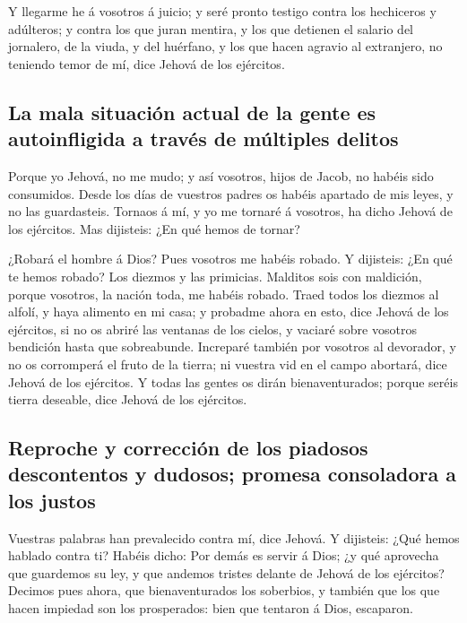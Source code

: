  Y llegarme he á vosotros á juicio; y seré pronto testigo
contra los hechiceros y adúlteros; y contra los que juran mentira, y los
que detienen el salario del jornalero, de la viuda, y del huérfano, y
los que hacen agravio al extranjero, no teniendo temor de mí, dice
Jehová de los ejércitos.

\hypertarget{la-mala-situaciuxf3n-actual-de-la-gente-es-autoinfligida-a-travuxe9s-de-muxfaltiples-delitos}{%
\subsection{La mala situación actual de la gente es autoinfligida a
través de múltiples
delitos}\label{la-mala-situaciuxf3n-actual-de-la-gente-es-autoinfligida-a-travuxe9s-de-muxfaltiples-delitos}}

 Porque yo Jehová, no me mudo; y así vosotros, hijos de
Jacob, no habéis sido consumidos.  Desde los días de
vuestros padres os habéis apartado de mis leyes, y no las guardasteis.
Tornaos á mí, y yo me tornaré á vosotros, ha dicho Jehová de los
ejércitos. Mas dijisteis: ¿En qué hemos de tornar?

 ¿Robará el hombre á Dios? Pues vosotros me habéis robado. Y
dijisteis: ¿En qué te hemos robado? Los diezmos y las primicias.
 Malditos sois con maldición, porque vosotros, la nación
toda, me habéis robado.  Traed todos los diezmos al alfolí,
y haya alimento en mi casa; y probadme ahora en esto, dice Jehová de los
ejércitos, si no os abriré las ventanas de los cielos, y vaciaré sobre
vosotros bendición hasta que sobreabunde.  Increparé
también por vosotros al devorador, y no os corromperá el fruto de la
tierra; ni vuestra vid en el campo abortará, dice Jehová de los
ejércitos.  Y todas las gentes os dirán bienaventurados;
porque seréis tierra deseable, dice Jehová de los ejércitos.

\hypertarget{reproche-y-correcciuxf3n-de-los-piadosos-descontentos-y-dudosos-promesa-consoladora-a-los-justos}{%
\subsection{Reproche y corrección de los piadosos descontentos y
dudosos; promesa consoladora a los
justos}\label{reproche-y-correcciuxf3n-de-los-piadosos-descontentos-y-dudosos-promesa-consoladora-a-los-justos}}

 Vuestras palabras han prevalecido contra mí, dice Jehová.
Y dijisteis: ¿Qué hemos hablado contra ti?  Habéis dicho:
Por demás es servir á Dios; ¿y qué aprovecha que guardemos su ley, y que
andemos tristes delante de Jehová de los ejércitos? 
Decimos pues ahora, que bienaventurados los soberbios, y también que los
que hacen impiedad son los prosperados: bien que tentaron á Dios,
escaparon.

